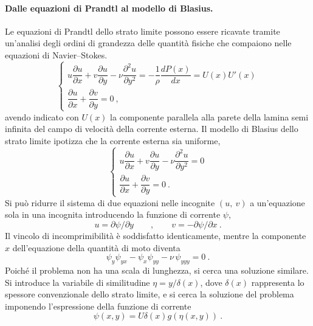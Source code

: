 \paragraph{Dalle equazioni di Prandtl al modello di Blasius.}
Le equazioni di Prandtl dello strato limite possono essere ricavate tramite un'analisi degli ordini di grandezza delle quantità fisiche che compaiono nelle equazioni di Navier--Stokes.
%
\begin{equation}
  \begin{cases}
      u\dfrac{\partial u}{\partial x} + v\dfrac{\partial u}{\partial y} - \nu \dfrac{\partial^2 u}{\partial y^2} = - \dfrac{1}{\rho} \dfrac{d P(x)}{d x} = U(x) U'(x) \\
    \dfrac{\partial u}{\partial x} + \dfrac{\partial v}{\partial y} = 0 \ ,
  \end{cases}
\end{equation}
avendo indicato con $U(x)$ la componente parallela alla parete della lamina semi infinita del campo di velocità della corrente esterna.
Il modello di Blasius dello strato limite ipotizza che la corrente esterna sia uniforme,
%
\begin{equation}
  \begin{cases}
      u\dfrac{\partial u}{\partial x} + v\dfrac{\partial u}{\partial y} - \nu \dfrac{\partial^2 u}{\partial y^2} = 0 \\
    \dfrac{\partial u}{\partial x} + \dfrac{\partial v}{\partial y} = 0 \ .
  \end{cases}
\end{equation}
%
Si può ridurre il sistema di due equazioni nelle incognite $(u,\ v)$ a un'equazione sola in una incognita introducendo la funzione di corrente $\psi$,
\begin{equation}
 u = \partial \psi / \partial y \qquad , \qquad v = - \partial \psi / \partial x \ .
\end{equation}
Il vincolo di incomprimibilità è soddisfatto identicamente, mentre la componente $x$ dell'equazione della quantità di moto diventa
\begin{equation}
 \psi_y \psi_{yx} - \psi_x \psi_{yy} - \nu \, \psi_{yyy} = 0 \ .
\end{equation}
%
Poiché il problema non ha una scala di lunghezza, si cerca una soluzione similare. Si introduce la variabile di similitudine $\eta = y/\delta(x)$, dove $\delta(x)$ rappresenta lo spessore convenzionale dello strato limite, e si cerca la soluzione del problema imponendo l'espressione della funzione di corrente
\begin{equation}
   \psi(x,y) = U \delta(x) g(\eta(x,y)) \ .
\end{equation}
